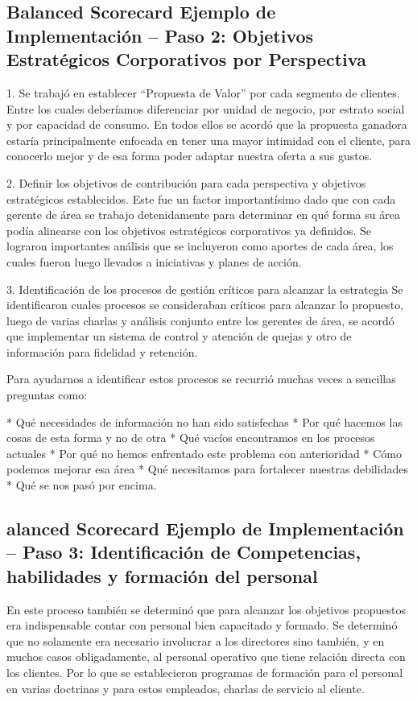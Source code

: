 \subsection{Balanced Scorecard Ejemplo de Implementación – Paso 2: Objetivos Estratégicos Corporativos por Perspectiva}
\item {1. Se trabajó en establecer “Propuesta de Valor” por cada segmento de clientes. Entre los cuales deberíamos diferenciar por unidad de negocio, por estrato social y por capacidad de consumo. En todos ellos se acordó que la propuesta ganadora estaría principalmente enfocada en tener una mayor intimidad con el cliente, para conocerlo mejor y de esa forma poder adaptar nuestra oferta a sus gustos.

2. Definir los objetivos de contribución para cada perspectiva y objetivos estratégicos establecidos.  Este fue un factor importantísimo dado que con cada gerente de área se trabajo detenidamente para determinar en qué forma su área podía alinearse con los objetivos estratégicos corporativos ya definidos. Se lograron importantes análisis que se incluyeron como aportes de cada área, los cuales fueron luego llevados a iniciativas y planes de acción.

3. Identificación de los procesos de gestión críticos para alcanzar la estrategia
Se identificaron cuales procesos se consideraban críticos para alcanzar lo propuesto, luego de varias charlas y análisis conjunto entre los gerentes de área, se acordó que implementar un sistema de control y atención de quejas y otro de información para fidelidad y retención.

Para ayudarnos a identificar estos procesos se recurrió muchas veces a sencillas preguntas como:

* Qué necesidades de información no han sido satisfechas
* Por qué hacemos las cosas de esta forma y no de otra
* Qué vacíos encontramos en los procesos actuales
* Por qué no hemos enfrentado este problema con anterioridad
* Cómo podemos mejorar esa área
* Qué necesitamos para fortalecer nuestras debilidades
* Qué se nos pasó por encima.}






\subsection{alanced Scorecard Ejemplo de Implementación – Paso 3: Identificación de Competencias, habilidades y formación del personal}
\item {En este proceso también se determinó que para alcanzar los objetivos propuestos era indispensable contar con personal bien capacitado y formado. Se determinó que no solamente era necesario involucrar a los directores sino también, y en muchos casos obligadamente, al personal operativo que tiene relación directa con los clientes. Por lo que se establecieron programas de formación para el personal en varias doctrinas y para estos empleados, charlas de servicio al cliente.}

